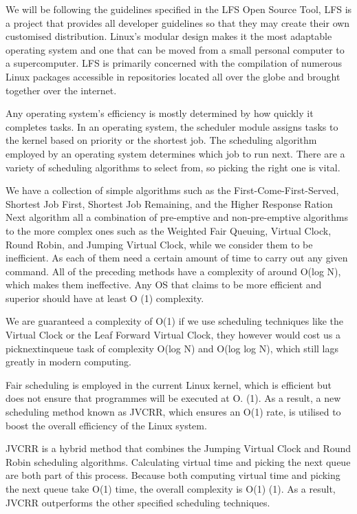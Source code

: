 We will be following the guidelines specified in the LFS Open Source Tool, LFS is a project that provides all developer guidelines so that they may create their own customised distribution. Linux's modular design makes it the most adaptable operating system and one that can be moved from a small personal computer to a supercomputer. LFS is primarily concerned with the compilation of numerous Linux packages accessible in repositories located all over the globe and brought together over the internet.

Any operating system's efficiency is mostly determined by how quickly it completes tasks. In an operating system, the scheduler module assigns tasks to the kernel based on priority or the shortest job. The scheduling algorithm employed by an operating system determines which job to run next. There are a variety of scheduling algorithms to select from, so picking the right one is vital.

We have a collection of simple algorithms such as the First-Come-First-Served, Shortest Job First, Shortest Job Remaining, and the Higher Response Ration Next algorithm all a combination of pre-emptive and non-pre-emptive algorithms to the more complex ones such as the Weighted Fair Queuing, Virtual Clock, Round Robin, and Jumping Virtual Clock, while we consider them to be inefficient. As each of them need a certain amount of time to carry out any given command. All of the preceding methods have a complexity of around O(log N), which makes them ineffective. Any OS that claims to be more efficient and superior should have at least O (1) complexity.

We are guaranteed a complexity of O(1) if we use scheduling techniques like the Virtual Clock or the Leaf Forward Virtual Clock, they however would cost us a picknextinqueue task of complexity O(log N) and O(log log N), which still lags greatly in modern computing.

Fair scheduling is employed in the current Linux kernel, which is efficient but does not ensure that programmes will be executed at O. (1). As a result, a new scheduling method known as JVCRR, which ensures an O(1) rate, is utilised to boost the overall efficiency of the Linux system.

JVCRR is a hybrid method that combines the Jumping Virtual Clock and Round Robin scheduling algorithms. Calculating virtual time and picking the next queue are both part of this process. Because both computing virtual time and picking the next queue take O(1) time, the overall complexity is O(1) (1). As a result, JVCRR outperforms the other specified scheduling techniques.
